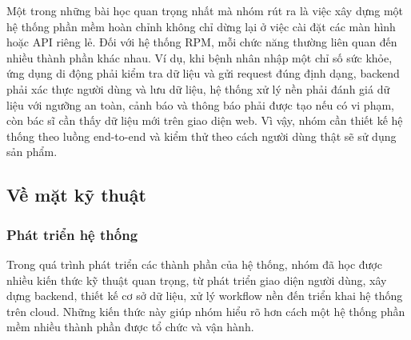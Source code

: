 \par Một trong những bài học quan trọng nhất mà nhóm rút ra là việc xây dựng một hệ thống phần mềm hoàn chỉnh không chỉ dừng lại ở việc cài đặt các màn hình hoặc API riêng lẻ. Đối với hệ thống RPM, mỗi chức năng thường liên quan đến nhiều thành phần khác nhau. Ví dụ, khi bệnh nhân nhập một chỉ số sức khỏe, ứng dụng di động phải kiểm tra dữ liệu và gửi request đúng định dạng, backend phải xác thực người dùng và lưu dữ liệu, hệ thống xử lý nền phải đánh giá dữ liệu với ngưỡng an toàn, cảnh báo và thông báo phải được tạo nếu có vi phạm, còn bác sĩ cần thấy dữ liệu mới trên giao diện web. Vì vậy, nhóm cần thiết kế hệ thống theo luồng end-to-end và kiểm thử theo cách người dùng thật sẽ sử dụng sản phẩm.

\subsection{Về mặt kỹ thuật}

\subsubsection{Phát triển hệ thống}
\par Trong quá trình phát triển các thành phần của hệ thống, nhóm đã học được nhiều kiến thức kỹ thuật quan trọng, từ phát triển giao diện người dùng, xây dựng backend, thiết kế cơ sở dữ liệu, xử lý workflow nền đến triển khai hệ thống trên cloud. Những kiến thức này giúp nhóm hiểu rõ hơn cách một hệ thống phần mềm nhiều thành phần được tổ chức và vận hành.

